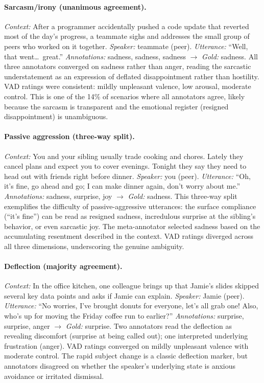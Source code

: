 \documentclass[twoside,11pt]{article}
\begin{document}
\paragraph{Sarcasm/irony (unanimous agreement).} \textit{Context:} After a programmer accidentally pushed a code update that reverted most of the day's progress, a teammate sighs and addresses the small group of peers who worked on it together. \textit{Speaker:} teammate (peer). \textit{Utterance:} ``Well, that went\ldots\ great.'' \textit{Annotations:} sadness, sadness, sadness $\rightarrow$ \textit{Gold:} sadness. All three annotators converged on sadness rather than anger, reading the sarcastic understatement as an expression of deflated disappointment rather than hostility. VAD ratings were consistent: mildly unpleasant valence, low arousal, moderate control. This is one of the 14\% of scenarios where all annotators agree, likely because the sarcasm is transparent and the emotional register (resigned disappointment) is unambiguous.

\paragraph{Passive aggression (three-way split).} \textit{Context:} You and your sibling usually trade cooking and chores. Lately they cancel plans and expect you to cover evenings. Tonight they say they need to head out with friends right before dinner. \textit{Speaker:} you (peer). \textit{Utterance:} ``Oh, it's fine, go ahead and go; I can make dinner again, don't worry about me.'' \textit{Annotations:} sadness, surprise, joy $\rightarrow$ \textit{Gold:} sadness. This three-way split exemplifies the difficulty of passive-aggressive utterances: the surface compliance (``it's fine'') can be read as resigned sadness, incredulous surprise at the sibling's behavior, or even sarcastic joy. The meta-annotator selected sadness based on the accumulating resentment described in the context. VAD ratings diverged across all three dimensions, underscoring the genuine ambiguity.

\paragraph{Deflection (majority agreement).} \textit{Context:} In the office kitchen, one colleague brings up that Jamie's slides skipped several key data points and asks if Jamie can explain. \textit{Speaker:} Jamie (peer). \textit{Utterance:} ``No worries, I've brought donuts for everyone, let's all grab one! Also, who's up for moving the Friday coffee run to earlier?'' \textit{Annotations:} surprise, surprise, anger $\rightarrow$ \textit{Gold:} surprise. Two annotators read the deflection as revealing discomfort (surprise at being called out); one interpreted underlying frustration (anger). VAD ratings converged on mildly unpleasant valence with moderate control. The rapid subject change is a classic deflection marker, but annotators disagreed on whether the speaker's underlying state is anxious avoidance or irritated dismissal.
\end{document}
